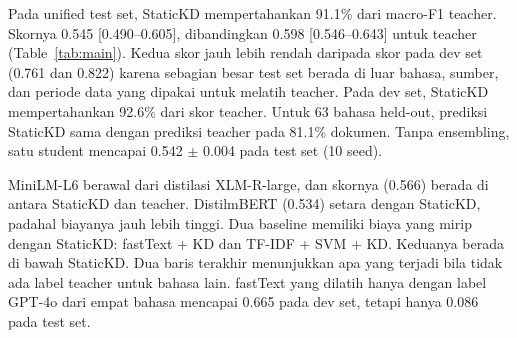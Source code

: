 \documentclass[journal]{IEEEtran}
\begin{document}
Pada unified test set, StaticKD mempertahankan 91.1\% dari macro-F1 teacher. Skornya 0.545 [0.490--0.605], dibandingkan 0.598 [0.546--0.643] untuk teacher (Table~\ref{tab:main}). Kedua skor jauh lebih rendah daripada skor pada dev set (0.761 dan 0.822) karena sebagian besar test set berada di luar bahasa, sumber, dan periode data yang dipakai untuk melatih teacher. Pada dev set, StaticKD mempertahankan 92.6\% dari skor teacher. Untuk 63 bahasa held-out, prediksi StaticKD sama dengan prediksi teacher pada 81.1\% dokumen. Tanpa ensembling, satu student mencapai 0.542 $\pm$ 0.004 pada test set (10 seed).

MiniLM-L6 berawal dari distilasi XLM-R-large, dan skornya (0.566) berada di antara StaticKD dan teacher. DistilmBERT (0.534) setara dengan StaticKD, padahal biayanya jauh lebih tinggi. Dua baseline memiliki biaya yang mirip dengan StaticKD: fastText + KD dan TF-IDF + SVM + KD. Keduanya berada di bawah StaticKD. Dua baris terakhir menunjukkan apa yang terjadi bila tidak ada label teacher untuk bahasa lain. fastText yang dilatih hanya dengan label GPT-4o dari empat bahasa mencapai 0.665 pada dev set, tetapi hanya 0.086 pada test set.
\end{document}
